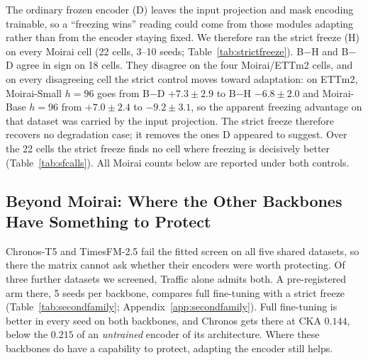 The ordinary frozen encoder (D) leaves the input projection and mask encoding
trainable, so a ``freezing wins'' reading could come from those modules adapting
rather than from the encoder staying fixed.  We therefore ran the strict freeze
(H) on every Moirai cell (22 cells, 3--10 seeds;
Table~\ref{tab:strictfreeze}).  B${-}$H and B${-}$D agree in sign on
18 cells.  They disagree on the four Moirai/ETTm2 cells, and on every disagreeing cell the strict control
moves toward adaptation: on ETTm2, Moirai-Small $h{=}96$ goes from B${-}$D
$+7.3{\pm}2.9$ to B${-}$H $-6.8{\pm}2.0$ and Moirai-Base $h{=}96$ from $+7.0{\pm}2.4$
to $-9.2{\pm}3.1$, so the apparent freezing advantage on that dataset was carried
by the input projection.  The strict freeze therefore recovers no degradation case;
it removes the ones D appeared to suggest.  Over the 22 cells the strict freeze
finds no cell where freezing is decisively better (Table~\ref{tab:sfcalls}).
All Moirai counts below are reported under both controls.

\begin{table}[t]
\centering\small
\caption{The two frozen arms on the same 22 Moirai cells: per-cell calls on
held-out $\denc$ (paired $t$-intervals, Benjamini--Hochberg across cells) and the
within-Moirai association between CKA and $\denc$, with intervals resampling
(backbone, dataset) clusters.  Per-cell values are in Table~\ref{tab:strictfreeze}.
Generated by \texttt{scripts/strict\_freeze\_inference.py}.}
\label{tab:sfcalls}
{\setlength{\tabcolsep}{4pt}}
\end{table}

\subsection{Beyond Moirai: Where the Other Backbones Have Something to Protect}
\label{sec:exp2:traffic}

Chronos-T5 and TimesFM-2.5 fail the fitted screen on all five shared datasets, so
there the matrix cannot ask whether their encoders were worth protecting.  Of three
further datasets we screened, Traffic alone admits both.  A pre-registered arm
there, 5 seeds per backbone, compares full fine-tuning with a strict freeze
(Table~\ref{tab:secondfamily}; Appendix~\ref{app:secondfamily}).  Full fine-tuning
is better in every seed on both backbones, and Chronos gets there at CKA $0.144$,
below the $0.215$ of an \emph{untrained} encoder of its architecture.  Where these
backbones do have a capability to protect, adapting the encoder still helps.

